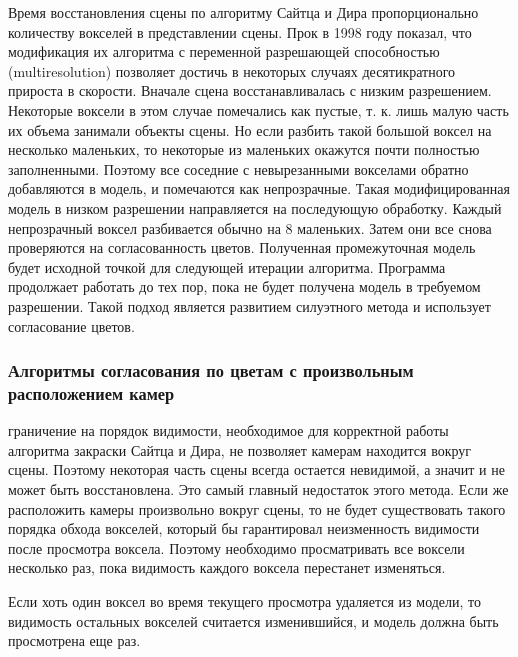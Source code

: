 Время восстановления сцены по алгоритму Сайтца и Дира пропорционально количеству вокселей в представлении сцены. Прок в 1998 году показал, что модификация их алгоритма с переменной разрешающей способностью (multiresolution) позволяет достичь в некоторых случаях десятикратного прироста в скорости. Вначале сцена восстанавливалась с низким разрешением. Некоторые воксели в этом случае помечались как пустые, т. к. лишь малую часть их объема занимали объекты сцены. Но если разбить такой большой воксел на несколько маленьких, то некоторые из маленьких окажутся почти полностью заполненными. Поэтому все соседние с невырезанными вокселами обратно добавляются в модель, и помечаются как непрозрачные. Такая модифицированная модель в низком разрешении направляется на последующую обработку. Каждый непрозрачный воксел разбивается обычно на 8 маленьких. Затем они все снова проверяются на согласованность цветов. Полученная промежуточная модель будет исходной точкой для следующей итерации алгоритма. Программа продолжает работать до тех пор, пока не будет получена модель в требуемом разрешении. Такой подход является развитием силуэтного метода и использует согласование цветов.

\subsubsection{Алгоритмы согласования по цветам с произвольным расположением камер}
граничение на порядок видимости, необходимое для корректной работы алгоритма закраски Сайтца и Дира, не позволяет камерам находится вокруг сцены. Поэтому некоторая часть сцены всегда остается невидимой, а значит и не может быть восстановлена. Это самый главный недостаток этого метода. Если же расположить камеры произвольно вокруг сцены, то не будет существовать такого порядка обхода вокселей, который бы гарантировал неизменность видимости после просмотра воксела. Поэтому необходимо просматривать все воксели несколько раз, пока видимость каждого воксела перестанет изменяться.

Если хоть один воксел во время текущего просмотра удаляется из модели, то видимость остальных вокселей считается изменившийся, и модель должна быть просмотрена еще раз.


